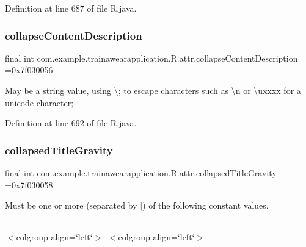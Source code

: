 Definition at line 687 of file R.\+java.

\mbox{\label{classcom_1_1example_1_1trainawearapplication_1_1_r_1_1attr_a448d3a65001709d554fac36ffcf22fac}} 
\subsubsection{\texorpdfstring{collapseContentDescription}{collapseContentDescription}}
{\footnotesize\ttfamily final int com.\+example.\+trainawearapplication.\+R.\+attr.\+collapse\+Content\+Description =0x7f030056\hspace{0.3cm}{\ttfamily [static]}}

May be a string value, using \textquotesingle{}\textbackslash{};\textquotesingle{} to escape characters such as \textquotesingle{}\textbackslash{}n\textquotesingle{} or \textquotesingle{}\textbackslash{}uxxxx\textquotesingle{} for a unicode character; 

Definition at line 692 of file R.\+java.

\mbox{\label{classcom_1_1example_1_1trainawearapplication_1_1_r_1_1attr_a5bd70475863b3286f30a180fa9065d9e}} 
\subsubsection{\texorpdfstring{collapsedTitleGravity}{collapsedTitleGravity}}
{\footnotesize\ttfamily final int com.\+example.\+trainawearapplication.\+R.\+attr.\+collapsed\+Title\+Gravity =0x7f030058\hspace{0.3cm}{\ttfamily [static]}}

Must be one or more (separated by \textquotesingle{}$\vert$\textquotesingle{}) of the following constant values.

\tabulinesep=1mm
\begin{longtabu}spread 0pt [c]{*{0}{|X[-1]}|}
\hline
\end{longtabu}
$<$colgroup align=\char`\"{}left\char`\"{}$>$ $<$colgroup align=\char`\"{}left\char`\"{}$>$ 

